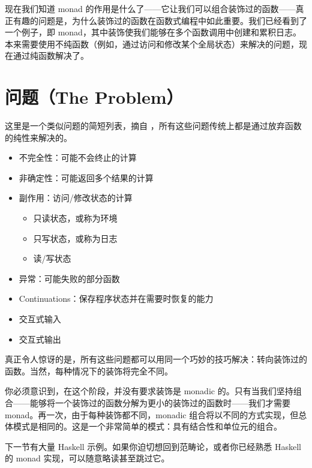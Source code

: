 
\lettrine[lhang=0.17]{现}{在我们知道} monad 的作用是什么了——它让我们可以组合装饰过的函数——真正有趣的问题是，为什么装饰过的函数在函数式编程中如此重要。我们已经看到了一个例子，即  monad，其中装饰使我们能够在多个函数调用中创建和累积日志。本来需要使用不纯函数（例如，通过访问和修改某个全局状态）来解决的问题，现在通过纯函数解决了。

\section{问题（The Problem）}

这里是一个类似问题的简短列表，摘自 ，所有这些问题传统上都是通过放弃函数的纯性来解决的。

\begin{itemize}
  \tightlist
  \item
  不完全性：可能不会终止的计算
  \item
  非确定性：可能返回多个结果的计算
  \item
  副作用：访问/修改状态的计算

  \begin{itemize}
    \tightlist
    \item
    只读状态，或称为环境
    \item
    只写状态，或称为日志
    \item
    读/写状态
  \end{itemize}
  \item
  异常：可能失败的部分函数
  \item
  Continuations：保存程序状态并在需要时恢复的能力
  \item
  交互式输入
  \item
  交互式输出
\end{itemize}

真正令人惊讶的是，所有这些问题都可以用同一个巧妙的技巧解决：转向装饰过的函数。当然，每种情况下的装饰将完全不同。

你必须意识到，在这个阶段，并没有要求装饰是 monadic 的。只有当我们坚持组合——能够将一个装饰过的函数分解为更小的装饰过的函数时——我们才需要 monad。再一次，由于每种装饰都不同，monadic 组合将以不同的方式实现，但总体模式是相同的。这是一个非常简单的模式：具有结合性和单位元的组合。

下一节有大量 Haskell 示例。如果你迫切想回到范畴论，或者你已经熟悉 Haskell 的 monad 实现，可以随意略读甚至跳过它。

